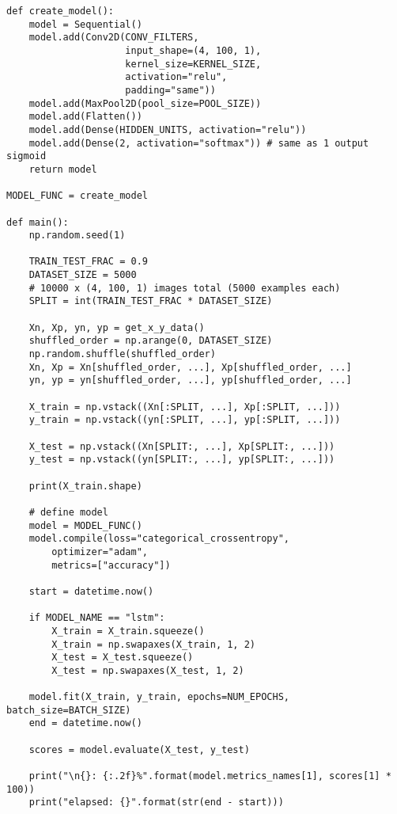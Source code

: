 \documentclass{article}[11pt]
\begin{document}
\begin{verbatim}
def create_model():
    model = Sequential()
    model.add(Conv2D(CONV_FILTERS,
                     input_shape=(4, 100, 1),
                     kernel_size=KERNEL_SIZE,
                     activation="relu",
                     padding="same"))
    model.add(MaxPool2D(pool_size=POOL_SIZE))
    model.add(Flatten())
    model.add(Dense(HIDDEN_UNITS, activation="relu"))
    model.add(Dense(2, activation="softmax")) # same as 1 output sigmoid
    return model

MODEL_FUNC = create_model

def main():
    np.random.seed(1)

    TRAIN_TEST_FRAC = 0.9
    DATASET_SIZE = 5000
    # 10000 x (4, 100, 1) images total (5000 examples each)
    SPLIT = int(TRAIN_TEST_FRAC * DATASET_SIZE)

    Xn, Xp, yn, yp = get_x_y_data()
    shuffled_order = np.arange(0, DATASET_SIZE)
    np.random.shuffle(shuffled_order)
    Xn, Xp = Xn[shuffled_order, ...], Xp[shuffled_order, ...]
    yn, yp = yn[shuffled_order, ...], yp[shuffled_order, ...]

    X_train = np.vstack((Xn[:SPLIT, ...], Xp[:SPLIT, ...]))
    y_train = np.vstack((yn[:SPLIT, ...], yp[:SPLIT, ...]))
    
    X_test = np.vstack((Xn[SPLIT:, ...], Xp[SPLIT:, ...]))
    y_test = np.vstack((yn[SPLIT:, ...], yp[SPLIT:, ...]))

    print(X_train.shape)

    # define model
    model = MODEL_FUNC()
    model.compile(loss="categorical_crossentropy",
        optimizer="adam",
        metrics=["accuracy"])

    start = datetime.now()

    if MODEL_NAME == "lstm":
        X_train = X_train.squeeze()
        X_train = np.swapaxes(X_train, 1, 2)
        X_test = X_test.squeeze()
        X_test = np.swapaxes(X_test, 1, 2)

    model.fit(X_train, y_train, epochs=NUM_EPOCHS, batch_size=BATCH_SIZE)
    end = datetime.now()

    scores = model.evaluate(X_test, y_test)

    print("\n{}: {:.2f}%".format(model.metrics_names[1], scores[1] * 100))
    print("elapsed: {}".format(str(end - start)))


\end{verbatim}
\end{document}
